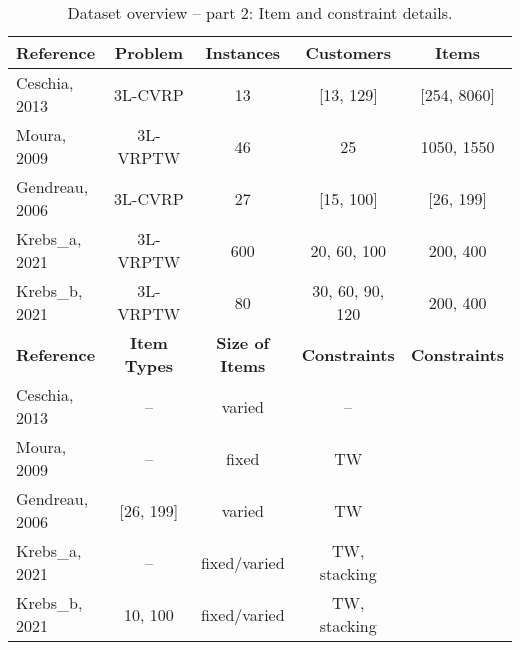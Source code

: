 \begin{table}[h!]
    \centering
    \begin{tabular}{@{}lcccc@{}}
        \toprule
        \textbf{Reference} & \textbf{Problem}    & \textbf{Instances}     & \textbf{Customers}   & \textbf{Items}       \\
        \midrule
        Ceschia, 2013      & 3L-CVRP             & 13                     & [13, 129]            & [254, 8060]          \\
        Moura, 2009        & 3L-VRPTW            & 46                     & 25                   & 1050, 1550           \\
        Gendreau, 2006     & 3L-CVRP             & 27                     & [15, 100]            & [26, 199]            \\
        Krebs\_a, 2021     & 3L-VRPTW            & 600                    & 20, 60, 100          & 200, 400             \\
        Krebs\_b, 2021     & 3L-VRPTW            & 80                     & 30, 60, 90, 120      & 200, 400             \\
        \toprule
        \textbf{Reference} & \textbf{Item Types} & \textbf{Size of Items} & \textbf{Constraints} & \textbf{Constraints} \\
        \midrule
        Ceschia, 2013      & --                  & varied                 & --                   &                      \\
        Moura, 2009        & --                  & fixed                  & TW                   &                      \\
        Gendreau, 2006     & [26, 199]           & varied                 & TW                   &                      \\
        Krebs\_a, 2021     & --                  & fixed/varied           & TW, stacking         &                      \\
        Krebs\_b, 2021     & 10, 100             & fixed/varied           & TW, stacking         &                      \\
        \bottomrule
    \end{tabular}
    \caption{Dataset overview – part 2: Item and constraint details.}
\end{table}
